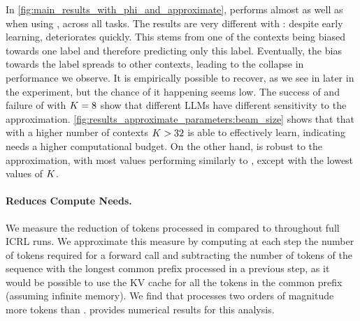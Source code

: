 In \autoref{fig:main_results_with_phi_and_approximate}, \appshort performs almost as well as \explorative when using \llama, across all tasks. 
The results are very different with \phillm: despite early learning, \appshort deteriorates quickly. 
This stems from one of the contexts being biased towards one label and therefore predicting only this label. Eventually, the bias towards the label spreads to other contexts, leading to the collapse in performance we observe. 
It is empirically possible to recover, as we see in \banking later in the experiment, but the chance of it happening seems low. 
The success of \llama and failure of \phillm with $K = 8$ show that different LLMs have different sensitivity to the approximation. 
\autoref{fig:results_approximate_parameters:beam_size} shows that that with a higher number of contexts $K > 32$ \phillm is able to effectively learn, indicating \phillm needs a higher computational budget. 
On the other hand, \llama is robust to the approximation, with most values performing similarly to \expshort, except with the lowest values of $K$.

\paragraph{\appshort Reduces Compute Needs.}

We measure the reduction of tokens processed in \appshort compared to \expshort throughout full ICRL runs. 
We approximate this measure by computing at each step the number of tokens required for a forward call and subtracting the number of tokens of the sequence with the longest common prefix processed in a previous step, as it would be possible to use the KV cache for all the tokens in the common prefix (assuming infinite memory). We find that \expshort processes two orders of magnitude more tokens than \appshort.  provides numerical results for this analysis.

